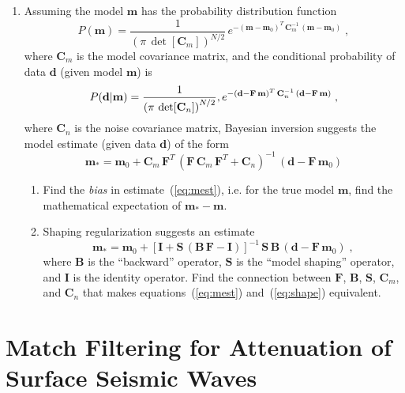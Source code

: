\begin{enumerate}
\item Assuming the model $\mathbf{m}$ has the probability distribution function 
\begin{equation}
\label{eq:pm}
P(\mathbf{m}) = \frac{1}{\left(\pi\,\det[\mathbf{C}_m]\right)^{N/2}}\,e^{-(\mathbf{m}-\mathbf{m}_0)^T\,\mathbf{C}_m^{-1}\,(\mathbf{m}-\mathbf{m}_0)}\;,
\end{equation}
where $\mathbf{C}_m$ is the model covariance matrix,
and the conditional probability of data $\mathbf{d}$ (given model $\mathbf{m}$) is
\begin{equation}
\label{eq:pdm}
P(\mathbf{d}|\mathbf{m}) = \frac{1}{\left(\pi\,\det[\mathbf{C}_n]\right)^{N/2}}\\,e^{-(\mathbf{d}-\mathbf{F}\,\mathbf{m})^T\,\mathbf{C}_n^{-1}\,(\mathbf{d}-\mathbf{F}\,\mathbf{m})}\;,
\end{equation}
where $\mathbf{C}_n$ is the noise covariance matrix, Bayesian inversion suggests the model estimate (given data $\mathbf{d}$) of the form
\begin{equation}
\label{eq:mest}
\mathbf{m}_{*} = \mathbf{m}_0 + 
\mathbf{C}_m\,\mathbf{F}^T\,\left(\mathbf{F}\,\mathbf{C}_m\,\mathbf{F}^T + \mathbf{C}_n\right)^{-1}\,\left(\mathbf{d} - \mathbf{F}\,\mathbf{m}_0\right)
\end{equation} 
\begin{enumerate}
\item Find the \emph{bias} in estimate~(\ref{eq:mest}), i.e. for the true model $\mathbf{m}$, find the mathematical expectation of $\mathbf{m}_{*}-\mathbf{m}$.
\item Shaping regularization suggests an estimate
\begin{equation}
\label{eq:shape}
\mathbf{m}_{*} = \mathbf{m}_0 + \left[\mathbf{I} + \mathbf{S}\,(\mathbf{B}\,\mathbf{F}-\mathbf{I})\right]^{-1}\,\mathbf{S}\,\mathbf{B}\,\left(\mathbf{d} - \mathbf{F}\,\mathbf{m}_0\right)\;,
\end{equation}
where $\mathbf{B}$ is the ``backward'' operator, $\mathbf{S}$ is the ``model shaping'' operator, and $\mathbf{I}$ is the identity operator.  Find the connection between $\mathbf{F}$, $\mathbf{B}$,  $\mathbf{S}$, $\mathbf{C}_m$, and $\mathbf{C}_n$ that makes equations~(\ref{eq:mest}) and~(\ref{eq:shape})
equivalent.
\end{enumerate}
\end{enumerate} 

\section{Match Filtering for Attenuation of Surface Seismic Waves}

